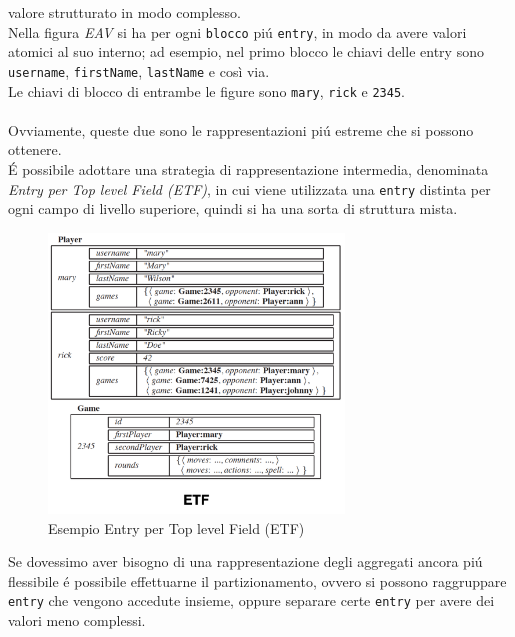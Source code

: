 valore strutturato in modo complesso.
\\
Nella figura \emph{EAV} si ha per ogni \texttt{blocco} piú \texttt{entry}, in modo da avere valori atomici al suo interno; ad esempio, nel primo blocco
le chiavi delle entry sono \texttt{username}, \texttt{firstName}, \texttt{lastName} e così via.\\
Le chiavi di blocco di entrambe le figure sono \texttt{mary}, \texttt{rick} e \texttt{2345}.
\\
\\
Ovviamente, queste due sono le rappresentazioni piú estreme che si possono ottenere.\\
É possibile adottare una strategia di rappresentazione intermedia, denominata \emph{Entry per Top level Field (ETF)}, in cui
viene utilizzata una \texttt{entry} distinta per ogni campo di livello superiore, quindi si ha una sorta di struttura mista.

\begin{figure}[H]
    \begin{center}
        \includegraphics[width=0.7\textwidth]{img/etf}
    \end{center}
\caption{Esempio Entry per Top level Field (ETF)}
\end{figure}
Se dovessimo aver bisogno di una rappresentazione degli aggregati ancora piú flessibile é possibile effettuarne il partizionamento,
ovvero si possono raggruppare \texttt{entry} che vengono accedute insieme, oppure separare certe \texttt{entry} per avere dei
valori meno complessi.

